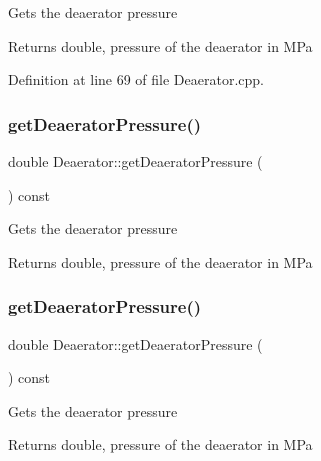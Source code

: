 Gets the deaerator pressure \begin{DoxyReturn}{Returns}
double, pressure of the deaerator in M\+Pa 
\end{DoxyReturn}


Definition at line 69 of file Deaerator.\+cpp.

\mbox{\label{class_deaerator_ac16cacdeef74e45f951fe992bac4e9e3}} 
\subsubsection{\texorpdfstring{get\+Deaerator\+Pressure()}{getDeaeratorPressure()}\hspace{0.1cm}{\footnotesize\ttfamily [2/3]}}
{\footnotesize\ttfamily double Deaerator\+::get\+Deaerator\+Pressure (\begin{DoxyParamCaption}{ }\end{DoxyParamCaption}) const}

Gets the deaerator pressure \begin{DoxyReturn}{Returns}
double, pressure of the deaerator in M\+Pa 
\end{DoxyReturn}
\mbox{\label{class_deaerator_ac16cacdeef74e45f951fe992bac4e9e3}} 
\subsubsection{\texorpdfstring{get\+Deaerator\+Pressure()}{getDeaeratorPressure()}\hspace{0.1cm}{\footnotesize\ttfamily [3/3]}}
{\footnotesize\ttfamily double Deaerator\+::get\+Deaerator\+Pressure (\begin{DoxyParamCaption}{ }\end{DoxyParamCaption}) const}

Gets the deaerator pressure \begin{DoxyReturn}{Returns}
double, pressure of the deaerator in M\+Pa 
\end{DoxyReturn}
\mbox{\label{class_deaerator_ae1524e8b406c3d5c2823ae4e6bafe389}} 

